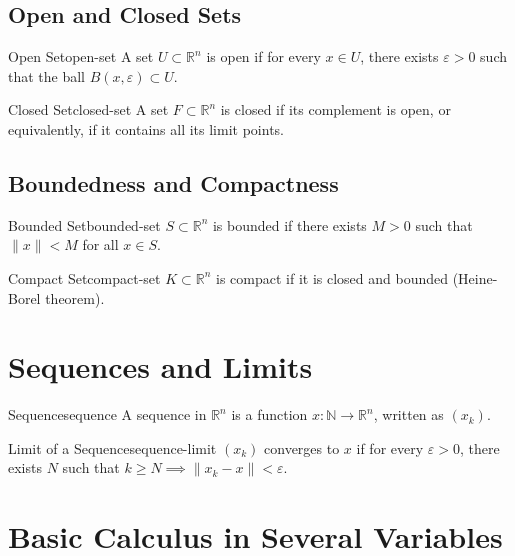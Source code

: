 \subsection{Open and Closed Sets}

\begin{definition}{Open Set}{open-set}
    A set \(U \subset \mathbb{R}^n\) is open if for every \(x \in U\), there exists \(\varepsilon > 0\) such that the ball \(B(x, \varepsilon) \subset U\).
\end{definition}

\begin{definition}{Closed Set}{closed-set}
    A set \(F \subset \mathbb{R}^n\) is closed if its complement is open, or equivalently, if it contains all its limit points.
\end{definition}

\subsection{Boundedness and Compactness}

\begin{definition}{Bounded Set}{bounded-set}
    \(S \subset \mathbb{R}^n\) is bounded if there exists \(M > 0\) such that \(\lVert x \rVert < M\) for all \(x \in S\).
\end{definition}

\begin{definition}{Compact Set}{compact-set}
    \(K \subset \mathbb{R}^n\) is compact if it is closed and bounded (Heine-Borel theorem).
\end{definition}

\section{Sequences and Limits}

\begin{definition}{Sequence}{sequence}
    A sequence in \(\mathbb{R}^n\) is a function \(x : \mathbb{N} \to \mathbb{R}^n\), written as \((x_k)\).
\end{definition}

\begin{definition}{Limit of a Sequence}{sequence-limit}
    \((x_k)\) converges to \(x\) if for every \(\varepsilon > 0\), there exists \(N\) such that \(k \geq N \implies \lVert x_k - x \rVert < \varepsilon\).
\end{definition}

\section{Basic Calculus in Several Variables}

